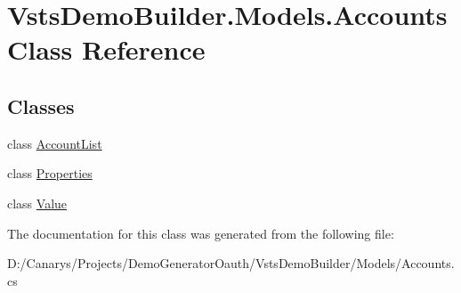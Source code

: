 \hypertarget{class_vsts_demo_builder_1_1_models_1_1_accounts}{}\section{Vsts\+Demo\+Builder.\+Models.\+Accounts Class Reference}
\label{class_vsts_demo_builder_1_1_models_1_1_accounts}
\subsection*{Classes}
\begin{DoxyCompactItemize}
\item 
class \mbox{\hyperlink{class_vsts_demo_builder_1_1_models_1_1_accounts_1_1_account_list}{Account\+List}}
\item 
class \mbox{\hyperlink{class_vsts_demo_builder_1_1_models_1_1_accounts_1_1_properties}{Properties}}
\item 
class \mbox{\hyperlink{class_vsts_demo_builder_1_1_models_1_1_accounts_1_1_value}{Value}}
\end{DoxyCompactItemize}


The documentation for this class was generated from the following file\+:\begin{DoxyCompactItemize}
\item 
D\+:/\+Canarys/\+Projects/\+Demo\+Generator\+Oauth/\+Vsts\+Demo\+Builder/\+Models/Accounts.\+cs\end{DoxyCompactItemize}
